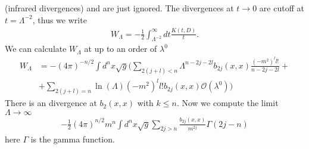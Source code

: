 \documentclass[a4paper]{article}
\theoremstyle{definition}
\theoremstyle{definition}
\theoremstyle{definition}
\theoremstyle{theorem}
\theoremstyle{theorem}
\theoremstyle{theorem}
\begin{document}
(infrared divergences) and are just ignored. The divergences at $t\rightarrow 0$
are cutoff at $t=\Lambda^{-2}$, thus we write
\begin{align}
    W_\Lambda = -\frac{1}{2} \int_{\Lambda^{-2}}^\infty dt \frac{K(t, D)}{t}.
\end{align}
We can calculate $W_\Lambda$ at up to an order of $\lambda ^0$
\begin{align}
    W_\Lambda &= -(4\pi)^{-n/2} \int d^n x\sqrt{g}\bigg(
    \sum_{2(j+l)<n}\Lambda^{n-2j-2l}b_{2j}(x,x) \frac{(-m^2)^l l!}{n-2j-2l} +\\
    &+ \sum_{2(j+l) =n }\ln(\Lambda) (-m^2)^l l! b_{2j}(x,x)
    \mathcal{O}(\lambda^0) \bigg)
\end{align}
There is an divergence at $b_2(x,x)$ with $k\leq n$. Now we compute the limit
$\Lambda \rightarrow \infty$
\begin{align}
    -\frac{1}{2}(4\pi)^{n/2}m^n\int d^n x\sqrt{g} \sum_{2j>n}
    \frac{b_{2j}(x,x)}{m^{2j}}\Gamma(2j-n)
\end{align}
here $\Gamma$ is the gamma function.
\end{document}
